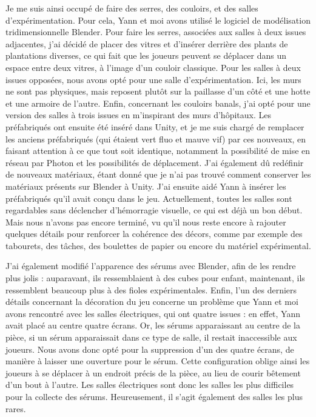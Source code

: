 \documentclass{article}
\begin{document}
Je me suis ainsi occupé de faire des serres, des couloirs, et des salles d'expérimentation. Pour cela, Yann et moi avons utilisé le logiciel de modélisation tridimensionnelle Blender. Pour faire les serres, associées aux salles à deux issues adjacentes, j'ai décidé de placer des vitres et d'insérer derrière des plants de plantations diverses, ce qui fait que les joueurs peuvent se déplacer dans un espace entre deux vitres, à l'image d'un couloir classique. Pour les salles à deux issues opposées, nous avons opté pour une salle d'expérimentation. Ici, les murs ne sont pas physiques, mais reposent plutôt sur la paillasse d'un côté et une hotte et une armoire de l'autre. Enfin, concernant les couloirs banals, j'ai opté pour une version des salles à trois issues en m'inspirant des murs d'hôpitaux. Les préfabriqués ont ensuite été inséré dans Unity, et je me suis chargé de remplacer les anciens préfabriqués (qui étaient vert fluo et mauve vif) par ces nouveaux, en faisant attention à ce que tout soit identique, notamment la possibilité de mise en réseau par Photon et les possibilités de déplacement. J'ai également dû redéfinir de nouveaux matériaux, étant donné que je n'ai pas trouvé comment conserver les matériaux présents sur Blender à Unity. J'ai ensuite aidé Yann à insérer les préfabriqués qu'il avait conçu dans le jeu. Actuellement, toutes les salles sont regardables sans déclencher d'hémorragie visuelle, ce qui est déjà un bon début. Mais nous n'avons pas encore terminé, vu qu'il nous reste encore à rajouter quelques détails pour renforcer la cohérence des décors, comme par exemple des tabourets, des tâches, des boulettes de papier ou encore du matériel expérimental.

J'ai également modifié l'apparence des sérums avec Blender, afin de les rendre plus jolis : auparavant, ils ressemblaient à des cubes pour enfant, maintenant, ils ressemblent beaucoup plus à des fioles expérimentales. Enfin, l'un des derniers détails concernant la décoration du jeu concerne un problème que Yann et moi avons rencontré avec les salles électriques, qui ont quatre issues : en effet, Yann avait placé au centre quatre écrans. Or, les sérums apparaissant au centre de la pièce, si un sérum apparaissait dans ce type de salle, il restait inaccessible aux joueurs. Nous avons donc opté pour la suppression d'un des quatre écrans, de manière à laisser une ouverture pour le sérum. Cette configuration oblige ainsi les joueurs à se déplacer à un endroit précis de la pièce, au lieu de courir bêtement d'un bout à l'autre. Les salles électriques sont donc les salles les plus difficiles pour la collecte des sérums. Heureusement, il s'agit également des salles les plus rares.
\end{document}
